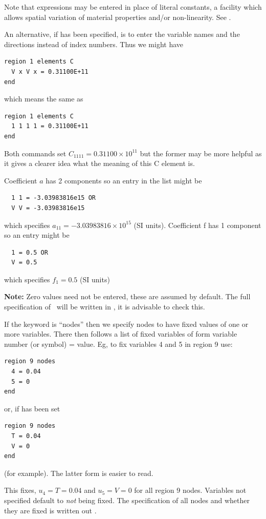 \documentclass[a4paper,twoside,11pt]{book}
\begin{document}
Note that expressions may be entered in place of literal constants, a
facility which allows spatial variation of material properties and/or
non-linearity. See .

An alternative, if  has been specified, is to enter the
variable names and the directions  instead of index numbers. Thus we might have
\begin{verbatim}
region 1 elements C
  V x V x = 0.31100E+11
end
\end{verbatim}
which means the same as
\begin{verbatim}
region 1 elements C
  1 1 1 1 = 0.31100E+11
end
\end{verbatim}
Both commands set $C_{1111}=0.31100\times10^{11}$ but the former may be
more helpful as it gives a clearer idea what the meaning of this C
element is.

Coefficient $a$ has 2 components so an entry in the list might be
\begin{verbatim}
  1 1 = -3.03983816e15 OR
  V V = -3.03983816e15
\end{verbatim}
which specifies $a_{11}=-3.03983816\times10^{15}$ (SI units). Coefficient
f has 1 component so an entry might be
\begin{verbatim}
  1 = 0.5 OR
  V = 0.5
\end{verbatim}
which specifies $f_1=0.5$ (SI units)

\textbf{Note:} Zero values need not be entered, these are assumed by
default. The full specification of \caf\ will be written in
, it is advisable to check this.

If the keyword is ``nodes'' then we specify nodes to have fixed values of
one or more variables. There then follows a list of fixed variables of form
variable number (or symbol) = value. Eg, to fix variables 4 and 5 in
region 9 use: 
\begin{verbatim}
region 9 nodes
  4 = 0.04 
  5 = 0 
end
\end{verbatim}
or, if  has been set
\begin{verbatim}
region 9 nodes
  T = 0.04 
  V = 0 
end
\end{verbatim}
(for example). The latter form is easier to read.

This fixes, $u_4=T=0.04$ and $u_5=V=0$ for all region 9 nodes. Variables
not specified default to \emph{not} being fixed. The specification of
all nodes and whether they are fixed is written out
.
\end{document}
